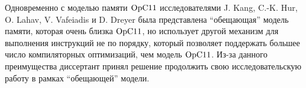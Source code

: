 Одновременно с моделью памяти $\mathrm{OpC11}$ исследователями J. Kang, C.-K. Hur, O. Lahav, V. Vafeiadis и D. Dreyer была представлена ``обещающая'' модель
памяти, которая очень близка $\mathrm{OpC11}$, но использует другой механизм для выполнения инструкций не по порядку, который позволяет
поддержать большее число компиляторных оптимизаций, чем модель $\mathrm{OpC11}$.
Из-за данного преимущества диссертант принял решение продолжить свою исследовательскую работу в рамках ``обещающей'' модели.




